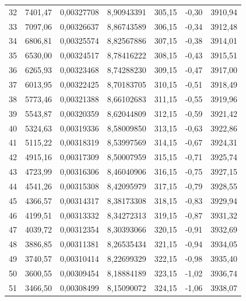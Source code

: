 \documentclass[12pt,a4paper,final,twoside,fleqn]{article}
\begin{document}
\begin{ThreePartTable}
\begin{longtable}{rrrrrrr}
32           & 7401,47   & 0,00327708    & 8,90943391  & 305,15     & -0,30      & 3910,94 \\
33           & 7097,06   & 0,00326637    & 8,86743589  & 306,15     & -0,34      & 3912,48 \\
34           & 6806,81   & 0,00325574    & 8,82567886  & 307,15     & -0,38      & 3914,01 \\
35           & 6530,00   & 0,00324517    & 8,78416222  & 308,15     & -0,43      & 3915,51 \\
36           & 6265,93   & 0,00323468    & 8,74288230  & 309,15     & -0,47      & 3917,00 \\
37           & 6013,95   & 0,00322425    & 8,70183705  & 310,15     & -0,51      & 3918,49 \\
38           & 5773,46   & 0,00321388    & 8,66102683  & 311,15     & -0,55      & 3919,96 \\
39           & 5543,87   & 0,00320359    & 8,62044809  & 312,15     & -0,59      & 3921,42 \\
40           & 5324,63   & 0,00319336    & 8,58009850  & 313,15     & -0,63      & 3922,86 \\
41           & 5115,22   & 0,00318319    & 8,53997569  & 314,15     & -0,67      & 3924,31 \\
42           & 4915,16   & 0,00317309    & 8,50007959  & 315,15     & -0,71      & 3925,74 \\
43           & 4723,99   & 0,00316306    & 8,46040906  & 316,15     & -0,75      & 3927,15 \\
44           & 4541,26   & 0,00315308    & 8,42095979  & 317,15     & -0,79      & 3928,55 \\
45           & 4366,57   & 0,00314317    & 8,38173308  & 318,15     & -0,83      & 3929,94 \\
46           & 4199,51   & 0,00313332    & 8,34272313  & 319,15     & -0,87      & 3931,32 \\
47           & 4039,72   & 0,00312354    & 8,30393066  & 320,15     & -0,91      & 3932,69 \\
48           & 3886,85   & 0,00311381    & 8,26535434  & 321,15     & -0,94      & 3934,05 \\
49           & 3740,57   & 0,00310414    & 8,22699329  & 322,15     & -0,98      & 3935,40 \\
50           & 3600,55   & 0,00309454    & 8,18884189  & 323,15     & -1,02      & 3936,74 \\
51           & 3466,50   & 0,00308499    & 8,15090072  & 324,15     & -1,06      & 3938,07 \\

\end{longtable}
\end{ThreePartTable}
\end{document}

